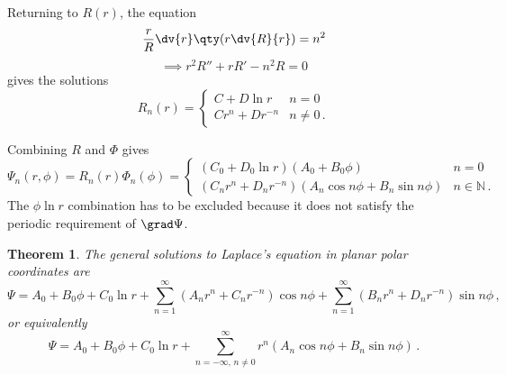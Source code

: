 \documentclass{article}
\theoremstyle{plain}\theoremheaderfont{\normalfont\itshape}\theorembodyfont{\rmfamily}\theoremseparator{.}\newtheorem*{rem}{Remark}\newtheorem*{ex}{Example}\newtheorem*{proof}{Proof}\newtheorem*{altp}{Alternative proof}
\theoremstyle{plain}\theoremheaderfont{\normalfont\bfseries}\theorembodyfont{\rmfamily}\theoremseparator{.}\newtheorem{thm}{Theorem}[section]\newtheorem{lem}[thm]{Lemma}\newtheorem{prop}[thm]{Proposition}\newtheorem*{cor}{Corollary}\newtheorem{defn}[thm]{Definition}\newtheorem{clm}[thm]{Claim}\newtheorem{clminproof}{Claim}
\theoremstyle{break}\theoremheaderfont{\normalfont\itshape}\theorembodyfont{\rmfamily}\theoremseparator{.\medskip}\newtheorem*{proofskip}{Proof}\newtheorem*{exs}{Examples}\newtheorem*{rems}{Remarks}
\theoremstyle{break}\theoremheaderfont{\normalfont\bfseries}\theorembodyfont{\rmfamily}\theoremseparator{.\medskip}\newtheorem{lemskip}[thm]{Lemma}\newtheorem{defnskip}[thm]{Definition}\newtheorem{propskip}[thm]{Proposition}\newtheorem{thmskip}[thm]{Theorem}
\numberwithin{equation}{section}
\begin{document}
	Returning to \(R(r)\), the equation
	\[\frac{r}{R}\dv{r}\qty(r\dv{R}{r})=n^2\]
	\[\implies r^2R''+rR'-n^2R=0\]
	gives the solutions
	\[R_n(r)=\begin{cases}
		C+D\ln r & n=0\\
		Cr^n+Dr^{-n} & n\ne 0\,.
	\end{cases}\]

	Combining \(R\) and \(\Phi\) gives
	\[\Psi_n(r,\phi)=R_n(r)\Phi_n(\phi)=\begin{cases}
		(C_0+D_0\ln r)(A_0+B_0\phi) & n=0\\
		(C_nr^n+D_nr^{-n})(A_n\cos n\phi+B_n\sin n\phi) & n\in\mathbb{N}\,.
	\end{cases}\]
	The \(\phi\ln r\) combination has to be excluded because it does not satisfy the periodic requirement of \(\grad\Psi\).
	
	\begin{thm}
		The general solutions to Laplace's equation in planar polar coordinates are
		\[\Psi=A_0+B_0\phi+C_0\ln r+\sum_{n=1}^{\infty}(A_nr^n+C_nr^{-n})\cos n\phi+\sum_{n=1}^{\infty}(B_nr^n+D_nr^{-n})\sin n\phi\,,\]
		or equivalently
		\[\Psi=A_0+B_0\phi+C_0\ln r+\sum_{n=-\infty,\,n\ne 0}^{\infty}r^n(A_n\cos n\phi+B_n\sin n\phi)\,.\]
	\end{thm}
\end{document}

